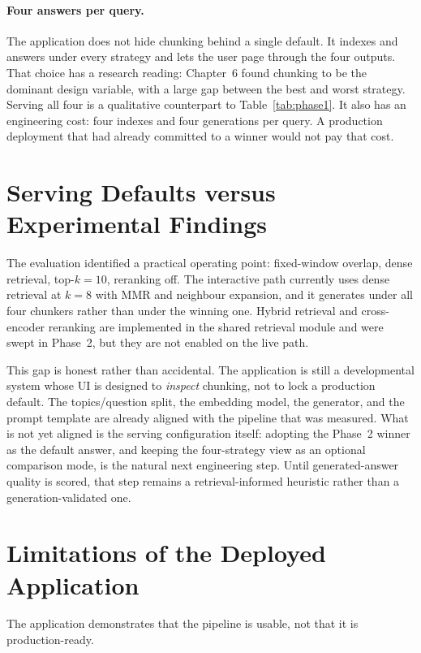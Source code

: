 \documentclass[12pt,a4paper,titlepage,oneside]{book}
\begin{document}
\paragraph{Four answers per query.} The application does not hide chunking behind a single default. It indexes and answers under every strategy and lets the user page through the four outputs. That choice has a research reading: Chapter~6 found chunking to be the dominant design variable, with a large gap between the best and worst strategy. Serving all four is a qualitative counterpart to Table~\ref{tab:phase1}. It also has an engineering cost: four indexes and four generations per query. A production deployment that had already committed to a winner would not pay that cost.

\section{Serving Defaults versus Experimental Findings}

The evaluation identified a practical operating point: fixed-window overlap, dense retrieval, top-$k=10$, reranking off. The interactive path currently uses dense retrieval at $k=8$ with MMR and neighbour expansion, and it generates under all four chunkers rather than under the winning one. Hybrid retrieval and cross-encoder reranking are implemented in the shared retrieval module and were swept in Phase~2, but they are not enabled on the live path.

This gap is honest rather than accidental. The application is still a developmental system whose UI is designed to \emph{inspect} chunking, not to lock a production default. The topics/question split, the embedding model, the generator, and the prompt template are already aligned with the pipeline that was measured. What is not yet aligned is the serving configuration itself: adopting the Phase~2 winner as the default answer, and keeping the four-strategy view as an optional comparison mode, is the natural next engineering step. Until generated-answer quality is scored, that step remains a retrieval-informed heuristic rather than a generation-validated one.

\section{Limitations of the Deployed Application}

The application demonstrates that the pipeline is usable, not that it is production-ready.
\end{document}
